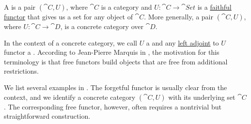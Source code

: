 \begin{definition}\label{def:concrete_category}
  A  is a pair \( (\cat{C}, U) \), where \( \cat{C} \) is a category and \( U: \cat{C} \to \cat{Set} \) is a \hyperref[def:functor_invertibility/faithful]{faithful functor} that gives us a set for any object of \( \cat{C} \). More generally, a pair \( (\cat{C}, U) \), where \( U: \cat{C} \to \cat{D} \), is a concrete category over \( \cat{D} \).

  In the context of a concrete category, we call \( U \) a  and any \hyperref[def:category_adjunction]{left adjoint} to \( U \) functor a . According to Jean-Pierre Marquis in \cite{StanfordPlato:category_theory}, the motivation for this terminology is that free functors build objects that are free from additional restrictions.

  We list several examples in . The forgetful functor is usually clear from the context, and we identify a concrete category \( (\cat{C}, U) \) with its underlying set \( \cat{C} \). The corresponding free functor, however, often requires a nontrivial but straightforward construction.
\end{definition}

